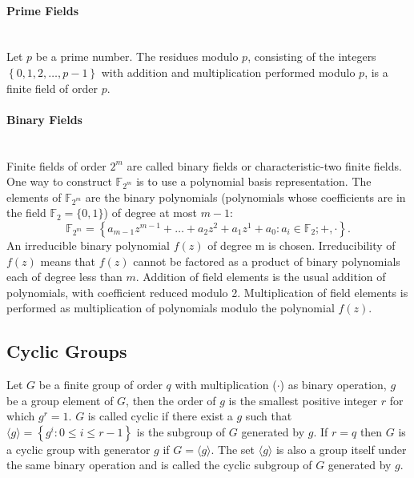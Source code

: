 \paragraph{Prime Fields}\mbox{}\\
Let $p$ be a prime number. The residues modulo $p$, consisting of the integers $\left\lbrace 0,1,2,\dots,p-1\right\rbrace $ with addition and multiplication performed modulo $p$, is a finite field of order $p$.
\paragraph{Binary Fields}\mbox{}\\
Finite fields of order $2^m$ are called binary fields or characteristic-two finite fields. One way to construct $\mathbb{F}_{2^m}$ is to use a polynomial basis representation. The elements of $\mathbb{F}_{2^m}$ are the binary polynomials (polynomials whose coefficients are in the field $\mathbb{F}_2=\{0,1\}$) of degree at most $m-1$:
$$\mathbb{F}_{2^m}=\left\lbrace a_{m-1}z^{m-1}+\dots+a_2z^2+a_1z^1+a_0 : a_i \in \mathbb{F}_2 ;+, \cdot \right\rbrace. $$
An irreducible binary polynomial $f(z)$ of degree m is chosen. Irreducibility of $f(z)$ means that $f(z)$ cannot be factored as a product of binary polynomials each of degree less than $m$. Addition of field elements is the usual addition of polynomials, with coefficient reduced modulo 2. Multiplication of field elements is performed as multiplication of polynomials modulo the polynomial $f(z)$. 
\subsection*{Cyclic Groups}
Let $G$ be a finite group of order $q$ with multiplication ($\cdot$) as binary operation, $g$ be a group element of $G$, then the order of $g$ is the smallest positive integer $r$ for which $g^r = 1$.  
$G$ is called cyclic if there exist a $g$ such that $\langle g \rangle = \left\lbrace g^i : 0 \leq i \leq r-1 \right\rbrace $ is the subgroup of $G$ generated by $g$. If $r=q$ then $G$ is a cyclic group with generator $g$ if $G = \langle g \rangle$. The set $\langle
 g \rangle$ is also a group itself under the same binary operation and is called the cyclic subgroup of $G$ generated by $g$.
